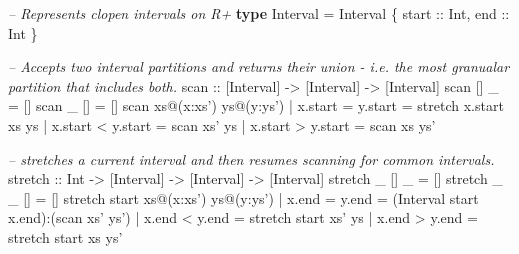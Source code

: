 \documentclass[]{article}
\newenvironment{Shaded}{}{}
\newcommand{\CommentTok}[1]{\textcolor[rgb]{0.38,0.63,0.69}{\textit{#1}}}
\newcommand{\DataTypeTok}[1]{\textcolor[rgb]{0.56,0.13,0.00}{#1}}
\newcommand{\KeywordTok}[1]{\textcolor[rgb]{0.00,0.44,0.13}{\textbf{#1}}}
\newcommand{\NormalTok}[1]{#1}
\newcommand{\OperatorTok}[1]{\textcolor[rgb]{0.40,0.40,0.40}{#1}}
\newcommand{\OtherTok}[1]{\textcolor[rgb]{0.00,0.44,0.13}{#1}}
\begin{document}
\begin{Shaded}
\begin{Highlighting}[]
\CommentTok{-- Represents clopen intervals on R+}
\KeywordTok{type} \DataTypeTok{Interval} \OtherTok{=} \DataTypeTok{Interval}\NormalTok{ \{}
\OtherTok{  start ::} \DataTypeTok{Int}\NormalTok{,}
\OtherTok{  end   ::} \DataTypeTok{Int}
\NormalTok{\}}

\CommentTok{-- Accepts two interval partitions and returns their union - i.e. the most granualar partition that includes both.}
\OtherTok{scan ::}\NormalTok{ [}\DataTypeTok{Interval}\NormalTok{] }\OtherTok{->}\NormalTok{ [}\DataTypeTok{Interval}\NormalTok{] }\OtherTok{->}\NormalTok{ [}\DataTypeTok{Interval}\NormalTok{]}
\NormalTok{scan [] _ }\OtherTok{=}\NormalTok{ []}
\NormalTok{scan _ [] }\OtherTok{=}\NormalTok{ []}
\NormalTok{scan xs}\OperatorTok{@}\NormalTok{(x}\OperatorTok{:}\NormalTok{xs') ys}\OperatorTok{@}\NormalTok{(y}\OperatorTok{:}\NormalTok{ys')}
  \OperatorTok{|}\NormalTok{ x}\OperatorTok{.}\NormalTok{start }\OtherTok{=}\NormalTok{ y}\OperatorTok{.}\NormalTok{start }\OtherTok{=}\NormalTok{ stretch x}\OperatorTok{.}\NormalTok{start xs ys}
  \OperatorTok{|}\NormalTok{ x}\OperatorTok{.}\NormalTok{start }\OperatorTok{<}\NormalTok{ y}\OperatorTok{.}\NormalTok{start }\OtherTok{=}\NormalTok{ scan xs' ys}
  \OperatorTok{|}\NormalTok{ x}\OperatorTok{.}\NormalTok{start }\OperatorTok{>}\NormalTok{ y}\OperatorTok{.}\NormalTok{start }\OtherTok{=}\NormalTok{ scan xs ys'}

\CommentTok{-- stretches a current interval and then resumes scanning for common intervals.}
\OtherTok{stretch ::} \DataTypeTok{Int} \OtherTok{->}\NormalTok{ [}\DataTypeTok{Interval}\NormalTok{] }\OtherTok{->}\NormalTok{ [}\DataTypeTok{Interval}\NormalTok{] }\OtherTok{->}\NormalTok{ [}\DataTypeTok{Interval}\NormalTok{]}
\NormalTok{stretch _ [] _ }\OtherTok{=}\NormalTok{ []}
\NormalTok{stretch _ _ [] }\OtherTok{=}\NormalTok{ []}
\NormalTok{stretch start xs}\OperatorTok{@}\NormalTok{(x}\OperatorTok{:}\NormalTok{xs') ys}\OperatorTok{@}\NormalTok{(y}\OperatorTok{:}\NormalTok{ys')}
  \OperatorTok{|}\NormalTok{ x}\OperatorTok{.}\NormalTok{end }\OtherTok{=}\NormalTok{ y}\OperatorTok{.}\NormalTok{end }\OtherTok{=}\NormalTok{ (}\DataTypeTok{Interval}\NormalTok{ start x}\OperatorTok{.}\NormalTok{end)}\OperatorTok{:}\NormalTok{(scan xs' ys')}
  \OperatorTok{|}\NormalTok{ x}\OperatorTok{.}\NormalTok{end }\OperatorTok{<}\NormalTok{ y}\OperatorTok{.}\NormalTok{end }\OtherTok{=}\NormalTok{ stretch start xs' ys}
  \OperatorTok{|}\NormalTok{ x}\OperatorTok{.}\NormalTok{end }\OperatorTok{>}\NormalTok{ y}\OperatorTok{.}\NormalTok{end }\OtherTok{=}\NormalTok{ stretch start xs ys'}
\end{Highlighting}
\end{Shaded}
\end{document}

